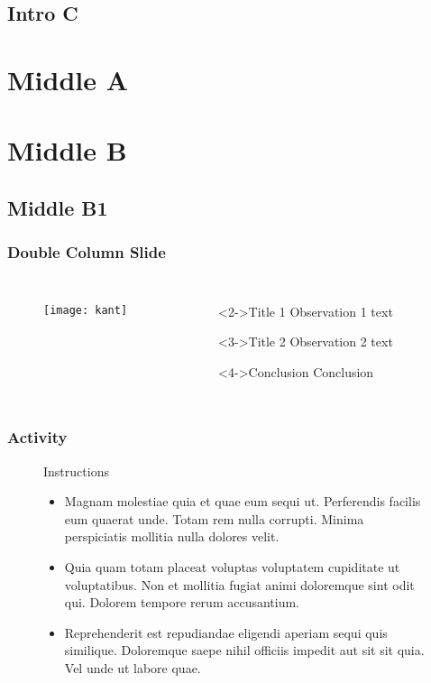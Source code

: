 \documentclass[12pt,presentation,notes]{beamer}
\begin{document}
\subsection{Intro C}
\section{Middle A}
\section{Middle B}
\subsection{Middle B1}


\begin{frame}
\frametitle{Double Column Slide}
\begin{columns}

\begin{figure}[HT]
\texttt{[image: kant]}
\end{figure}


\begin{figure}[HT]
\begin{block}<2->{Title 1}
	Observation 1 text
\end{block}
\begin{block}<3->{Title 2}
	Observation 2 text
\end{block}
\begin{block}<4->{Conclusion}
	Conclusion
\end{block}

\end{figure}
\end{columns}
\end{frame}

\begin{frame}
\frametitle{Activity}

\begin{figure}[HT]

\begin{block}{Instructions}
\begin{itemize}[]
\item Magnam molestiae quia et quae eum sequi ut. Perferendis facilis eum quaerat unde. Totam rem nulla corrupti. Minima perspiciatis mollitia nulla dolores velit.

\item Quia quam totam placeat voluptas voluptatem cupiditate ut voluptatibus. Non et mollitia fugiat animi doloremque sint odit qui. Dolorem tempore rerum accusantium.

\item Reprehenderit est repudiandae eligendi aperiam sequi quis similique. Doloremque saepe nihil officiis impedit aut sit sit quia. Vel unde ut labore quae.
\end{itemize}
\end{block}
\end{figure}

\end{frame}
\end{document}

